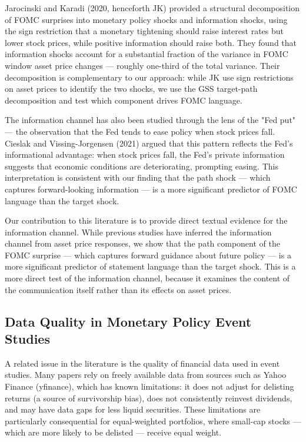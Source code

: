 \documentclass[12pt]{article}
\begin{document}
Jarocinski and Karadi (2020, henceforth JK) provided a structural decomposition of FOMC surprises into monetary policy shocks and information shocks, using the sign restriction that a monetary tightening should raise interest rates but lower stock prices, while positive information should raise both. They found that information shocks account for a substantial fraction of the variance in FOMC window asset price changes --- roughly one-third of the total variance. Their decomposition is complementary to our approach: while JK use sign restrictions on asset prices to identify the two shocks, we use the GSS target-path decomposition and test which component drives FOMC language.

The information channel has also been studied through the lens of the "Fed put" --- the observation that the Fed tends to ease policy when stock prices fall. Cieslak and Vissing-Jorgensen (2021) argued that this pattern reflects the Fed's informational advantage: when stock prices fall, the Fed's private information suggests that economic conditions are deteriorating, prompting easing. This interpretation is consistent with our finding that the path shock --- which captures forward-looking information --- is a more significant predictor of FOMC language than the target shock.

Our contribution to this literature is to provide direct textual evidence for the information channel. While previous studies have inferred the information channel from asset price responses, we show that the path component of the FOMC surprise --- which captures forward guidance about future policy --- is a more significant predictor of statement language than the target shock. This is a more direct test of the information channel, because it examines the content of the communication itself rather than its effects on asset prices.

\subsection{Data Quality in Monetary Policy Event Studies}

A related issue in the literature is the quality of financial data used in event studies. Many papers rely on freely available data from sources such as Yahoo Finance (yfinance), which has known limitations: it does not adjust for delisting returns (a source of survivorship bias), does not consistently reinvest dividends, and may have data gaps for less liquid securities. These limitations are particularly consequential for equal-weighted portfolios, where small-cap stocks --- which are more likely to be delisted --- receive equal weight.
\end{document}
